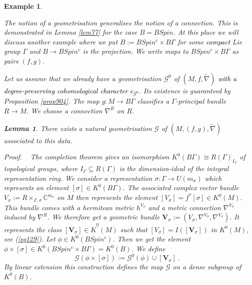 \documentclass[12pt]{article}
\newtheorem{lem}[theorem]{Lemma}
\newtheorem{ex}[theorem]{Example}
\newcommand{\cG}{{\mathcal{G}}}
\newcommand{\proof}{{\it Proof.$\:\:\:\:$}}
\newcommand{\C}{{\mathbb{C}}}
\newcommand{\bV}{{\mathbf{V}}}
\begin{document}
\begin{ex}\label{example1}{\rm The notion of a geometrisation generalises the notion of a connection.
This is demonstrated in Lemma  \ref{lem77} for the case $B=BSpin$.
At this place we will discuss another example where we put $B:=BSpin^{c}\times B\Gamma$ for some \textcolor{black}{compact} Lie group $\Gamma$ and $B\to BSpin^{c}$ is the projection. We write maps to $BSpin^{c}\times B
\Gamma$ as pairs $(f,g)$. 
 
 Let us assume that we already have a geometrisation $\cG^{0}$ of
$(M,f,\tilde \nabla)$ \textcolor{black}{with a degree-preserving cohomological character $c_{\cG^{0}}$}. Its existence is guaranteed by Proposition \ref{prop904}. 
The map $g:M\to B\Gamma$ classifies a $\Gamma$-principal bundle
$R\to M$. We choose a connection  $\nabla^{R}$ on $R$.

\begin{lem}\label{cgl1} There exists a natural 
  geometrisation 
$\cG$ of $(M,(f,g),\tilde \nabla)$
associated to this data.
 \end{lem}
 \proof
The completion theorem \cite{MR0259946} gives an isomorphism $K^{0}(B\Gamma)\cong R(\Gamma)^{\hat{}}_{I_{\Gamma}}$ of topological groups, where  $I_{\Gamma}\subseteq R(\Gamma)$ is the dimension-ideal of the integral representation ring.
We consider a representation   $\sigma:\Gamma\to U(m_{\sigma})$ which represents an element $[\sigma]\in K^{0}(B\Gamma)$.
The
 associated complex vector bundle
 $V_{\sigma}:=R\times_{\Gamma,\sigma}\C^{m_{\sigma}}$ on $M$ then represents the element
 $[V_{\sigma}]=f^{*}[\sigma]\in K^{0}(M)$.
This bundle comes  with a hermitean metric
 $h^{V_{\sigma}}$ and a metric connection $\nabla^{V_{\sigma}}$ induced by   $\nabla^{R}$.
We therefore get a geometric bundle  $\bV_{\sigma}:=(V_{\sigma},\nabla^{V_{\sigma}},\nabla^{V_{\sigma}})$. It represents the class $[\bV_{\sigma}]\in \hat K^{0}(M)$ such that   $[V_{\sigma}]=I([\bV_{\sigma}])$ in $K^{0}(M)$, see (\ref{eq129}).
Let $\phi\in K^{0}(BSpin^{c})$. Then we get the element $\phi\times [\sigma]\in K^{0}(BSpin^{c}\times  B\Gamma)=K^{0}(B)$. We define
$$\cG(\phi\times [\sigma]):=\cG^{0}(\phi)\cup [\bV_{\sigma}]\ .$$
By linear extension this construction defines the map $\cG$   on a dense subgroup of
$K^{0}(B)$.

}
\end{ex}
\end{document}
